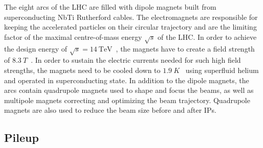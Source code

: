 The eight arcs of the LHC are filled with dipole magnets built from superconducting NbTi Rutherford cables. The electromagnets are responsible for keeping the accelerated particles on their circular trajectory and are the limiting factor of the maximal centre-of-mass energy $\sqrt{s}$ of the LHC. In order to achieve the design energy of $\sqrt{s} = \SI{14}{\TeV}$~\cite{Bruning:782076}, the magnets have to create a field strength of $\SI{8.3}{T}$~\cite{Evans:1129806}. In order to sustain the electric currents needed for such high field strengths, the magnets need to be cooled down to $\SI{1.9}{K}$~\cite{Evans:1129806} using superfluid helium and operated in superconducting state. In addition to the dipole magnets, the arcs contain quadrupole magnets used to shape and focus the beams, as well as multipole magnets correcting and optimizing the beam trajectory. Quadrupole magnets are also used to reduce the beam size before and after IPs.

\subsection{Pileup}

